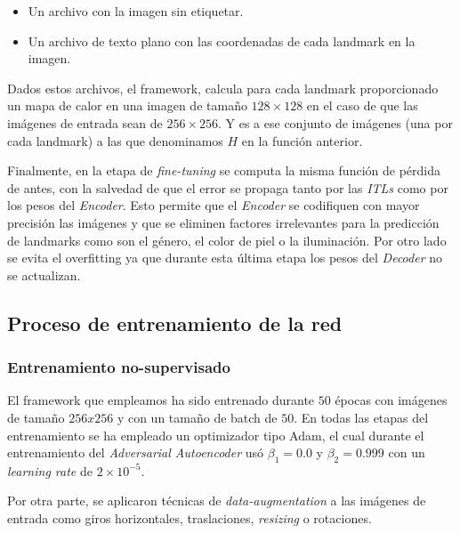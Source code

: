         \begin{itemize}
            \item Un archivo con la imagen sin etiquetar. 
            \item Un archivo de texto plano con las coordenadas de cada landmark en la imagen.
        \end{itemize}

        \noindent Dados estos archivos, el framework, calcula para cada landmark proporcionado un mapa de calor en una imagen de tamaño $128 \times 128$ en el caso de que las imágenes de entrada sean de $256 \times 256$. Y es a ese conjunto de imágenes (una por cada landmark) a las que denominamos $H$ en la función anterior.

        \medskip

        \noindent Finalmente, en la etapa de \textit{fine-tuning} se computa la misma función de pérdida de antes, con la salvedad de que el error se propaga tanto por las \textit{ITLs} como por los pesos del \textit{Encoder}. Esto permite que el \textit{Encoder} se codifiquen con mayor precisión las imágenes y que se eliminen factores irrelevantes para la predicción de landmarks como son el género, el color de piel o la iluminación. Por otro lado se evita el overfitting ya que durante esta última etapa los pesos del \textit{Decoder} no se actualizan.

    \subsection{Proceso de entrenamiento de la red}

        \subsubsection*{Entrenamiento no-supervisado}
            \noindent El framework que empleamos ha sido entrenado durante $50$ épocas con imágenes de tamaño $256x256$ y con un tamaño de batch de $50$. En todas las etapas del entrenamiento se ha empleado un optimizador tipo Adam, el cual durante el entrenamiento del \textit{Adversarial Autoencoder} usó $\beta_1=0.0$ y $\beta_2=0.999$ con un \textit{learning rate} de $2\times 10^{-5}$.

            \medskip

            \noindent Por otra parte, se aplicaron técnicas de \textit{data-augmentation} a las imágenes de entrada como giros horizontales, traslaciones, \textit{resizing} o rotaciones.

